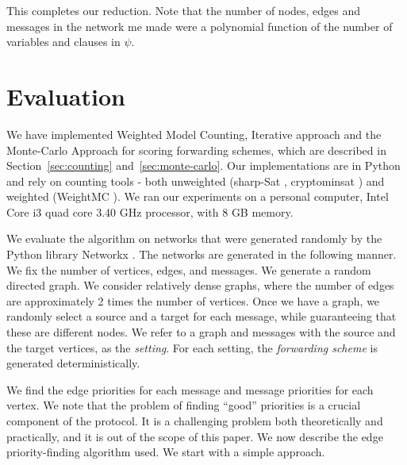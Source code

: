 \documentclass[11pt,eepic]{article}
\begin{document}
		This completes our reduction. Note that the number of nodes, edges and messages in the network me made were a polynomial function of the number of variables and clauses in $\psi$.
\section{Evaluation}
	\label{sec:eval}
	We have implemented Weighted Model Counting, Iterative approach and the Monte-Carlo Approach for scoring forwarding schemes, which are described in Section~\ref{sec:counting} and~\ref{sec:monte-carlo}. Our implementations are in Python and rely on counting tools - both unweighted (sharp-Sat \cite{sharpSat}, cryptominsat \cite{cryptominsat}) and weighted (WeightMC \cite{WeightMC}). We ran our experiments on a personal computer, Intel Core i3 quad core 3.40 GHz processor, with 8 GB memory.

		We evaluate the algorithm on networks that were generated randomly by the Python library Networkx
		 \cite{HSS08}.
		The networks are generated in the following manner.
		We fix the number of vertices, edges, and messages.
		We generate a random directed graph.
		We consider relatively dense graphs, where the number of edges are approximately 2 times the number of vertices.
		Once we have a graph, we randomly select a source and a target for each message,
		while guaranteeing that these are different nodes.
		We refer to a graph and messages with the source and the target vertices,
		as the {\em setting}.
		For each setting, the {\em forwarding scheme} is generated deterministically.

		We find the edge priorities for each message and message priorities for each vertex. We note that the problem of finding ``good'' priorities is a crucial component of the protocol. It is a challenging problem both theoretically and practically, and it is out of the scope of this paper. We now describe the edge priority-finding algorithm used. We start with a simple approach.
\end{document}
